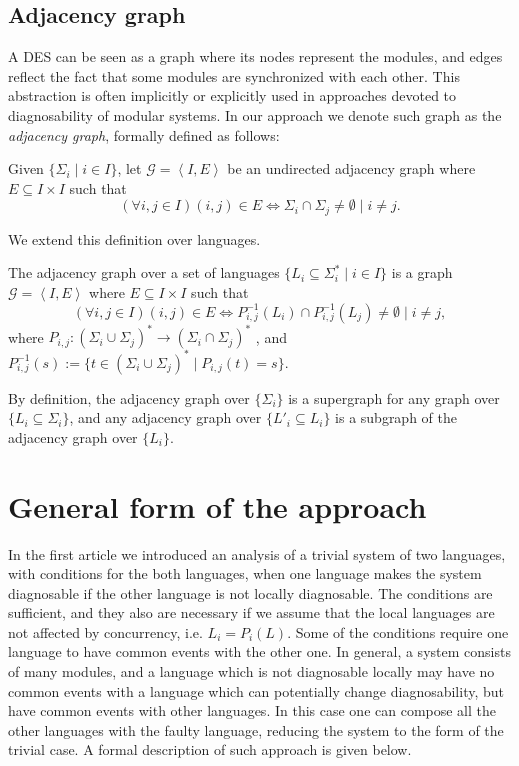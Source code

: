 \documentclass[a4paper, 10pt, conference]{ieeeconf}
\begin{document}
\subsection{Adjacency graph}
A DES can be seen as a graph where its nodes represent the modules, and edges
reflect the fact that some modules are synchronized with each other. This
abstraction is often implicitly or explicitly used in approaches devoted to
diagnosability of modular systems. In our approach we denote such graph as the
\emph{adjacency graph}, formally defined as follows:
\begin{definition}
\label{def:graph_events}
Given $\{\Sigma_i \mid i \in I \}$, let $\mathcal{G} = \left<I, E\right>$ be an
undirected adjacency graph where $E \subseteq I \times
I$ such that 
$$(\forall i, j \in I)(i, j) \in E \Leftrightarrow 
	\Sigma_i \cap \Sigma_j \neq \emptyset \mid i \neq j.$$
\end{definition}
We extend this definition over languages.
\begin{definition}
\label{def:graph_languages}
The adjacency graph over a set of languages $\{L_i \subseteq \Sigma_i^* \mid i
\in I \}$ is a graph $\mathcal{G} = \left<I, E\right>$ where $E \subseteq I \times
I$ such that 
$$(\forall i, j \in I)(i, j) \in E \Leftrightarrow
	P_{i,j}^{-1}(L_i) \cap P_{i,j}^{-1}(L_j) \neq \emptyset \mid i \neq j, 
$$
where 
$P_{i,j} : (\Sigma_i \cup \Sigma_j)^* \rightarrow (\Sigma_i \cap \Sigma_j)^*$
, and  
$P_{i,j}^{-1}(s) := \{t \in (\Sigma_i \cup \Sigma_j)^* \mid P_{i,j}(t) = s\}$.
\end{definition}

By definition, the adjacency graph over $\{\Sigma_i\}$ is a supergraph for any
graph over $\{L_i \subseteq \Sigma_i\}$, and any adjacency graph over $\{L'_i
\subseteq L_i\}$ is a subgraph of the adjacency graph over $\{L_i\}$.



\section{General form of the approach}
\label{sec:General}
In the first article we introduced an analysis of a trivial system of two
languages, with conditions for the both languages, when one language makes the
system diagnosable if the other language is not locally diagnosable.
The conditions are sufficient, and they also are necessary if we assume that the
local languages are not affected by concurrency, i.e. $L_i = P_i(L)$. Some of
the conditions require one language to have common events with the other one. In
general, a system consists of many modules, and a language which is not
diagnosable locally may have no common events with a language which can
potentially change diagnosability, but have common events with other languages.
In this case one can compose all the other languages with the faulty language,
reducing the system to the form of the trivial case. A formal description of
such approach is given below.
\end{document}
